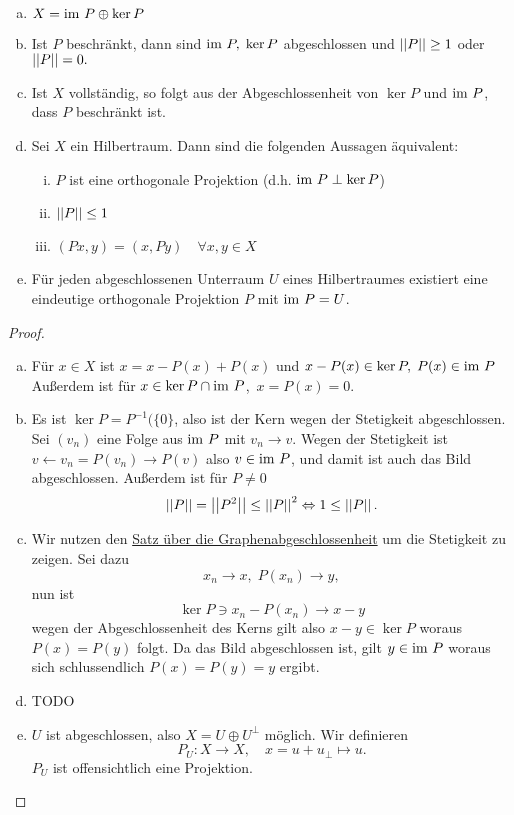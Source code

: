 \documentclass[FunkAnaSkript.tex]{subfiles}
\begin{document}
	\begin{enumerate}[(a)]
		\item $X = \textnormal{im } P \oplus \ker P$
		\item Ist $P$ beschränkt, dann sind $\textnormal{im } P,\; \ker P$ abgeschlossen und $\left\lvert \left\lvert  P  \right\rvert \right\rvert \geq 1$ oder $\left\lvert \left\lvert  P  \right\rvert \right\rvert = 0.$
		\item Ist $X$ vollständig, so folgt aus der Abgeschlossenheit von $\ker P$ und $\textnormal{im } P$, dass $P$ beschränkt ist.
		\item Sei $X$ ein Hilbertraum. Dann sind die folgenden Aussagen äquivalent: 
		\begin{enumerate}[(i)]
			\item $P$ ist eine orthogonale Projektion (d.h. $\textnormal{im } P \perp \ker P$)
			\item $\left\lvert \left\lvert  P  \right\rvert \right\rvert \leq 1$
			
			\item $(Px, y) = (x, Py) \quad  \forall x,y \in X$
		\end{enumerate}
		\item Für jeden abgeschlossenen Unterraum $U$ eines Hilbertraumes existiert eine eindeutige orthogonale Projektion $P$ mit $\textnormal{im } P = U$.
	\end{enumerate}
	
	\begin{proof}
		\begin{enumerate}[(a)]
		\item Für $x\in X$ ist $x = x - P(x) + P(x)$ und $x-P(x) \in \ker P,\; P(x)\in \textnormal{im } P$
		Außerdem ist für $x \in \ker P \cap \textnormal{im } P$,\, $x = P(x) = 0$.
		
		\item Es ist $\ker P = P^{-1}(\{0\}$, also ist der Kern wegen der Stetigkeit abgeschlossen. Sei $(v_n)$ eine Folge aus $\textnormal{im } P$ mit $v_n \to v$. Wegen der Stetigkeit ist
		$v \leftarrow v_n = P(v_n) \to P(v)$		
		also $v \in \textnormal{im } P$, und damit ist auch das Bild abgeschlossen.
		Außerdem ist für $P \not = 0$
		$$\left\lvert \left\lvert P \right\rvert \right\rvert = \left\lvert \left\lvert P^2 \right\rvert \right\rvert \leq \left\lvert \left\lvert P \right\rvert \right\rvert^2 \Leftrightarrow 1 \leq \left\lvert \left\lvert P \right\rvert \right\rvert.$$
		
		\item Wir nutzen den \hyperref[thm:2.8]{Satz über die Graphenabgeschlossenheit} um die Stetigkeit zu zeigen. Sei dazu $$x_n \to x,\; P(x_n)\to y,$$ nun ist 
		$$\ker P \ni x_n - P(x_n) \to x - y$$
		wegen der Abgeschlossenheit des Kerns gilt also $x-y \in \ker P$ woraus $P(x) = P(y)$ folgt. Da das Bild abgeschlossen ist, gilt $y\in \textnormal{im } P$ woraus sich schlussendlich $P(x) = P(y) = y$ ergibt.
		
		\item TODO
		
		\item $U$ ist abgeschlossen, also $X = U \oplus U^\perp$ möglich. Wir definieren
		$$P_U : X \to X,\quad x = u + u_\perp \mapsto u.$$
		$P_U$ ist offensichtlich eine Projektion.
		
		\end{enumerate}			
	
	\end{proof}
	
\end{document}
